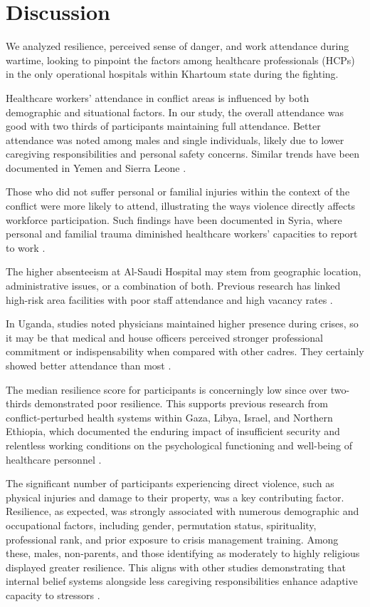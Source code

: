 \documentclass[12pt]{article}
\begin{document}
\section{Discussion}
We analyzed resilience, perceived sense of danger, and work attendance during wartime, looking to pinpoint the factors among healthcare professionals (HCPs) in the only operational hospitals within Khartoum state during the fighting.

Healthcare workers’ attendance in conflict areas is influenced by both demographic and situational factors. In our study, the overall attendance was good with two thirds of participants maintaining full attendance. Better attendance was noted among males and single individuals, likely due to lower caregiving responsibilities and personal safety concerns. Similar trends have been documented in Yemen and Sierra Leone \cite{khader2015factors, wurie2016retention}.

Those who did not suffer personal or familial injuries within the context of the conflict were more likely to attend, illustrating the ways violence directly affects workforce participation. Such findings have been documented in Syria, where personal and familial trauma diminished healthcare workers’ capacities to report to work \cite{fouad2017health, witter2017providing}.

The higher absenteeism at Al-Saudi Hospital may stem from geographic location, administrative issues, or a combination of both. Previous research has linked high-risk area facilities with poor staff attendance and high vacancy rates \cite{pavignani2009analysing}.

In Uganda, studies noted physicians maintained higher presence during crises, so it may be that medical and house officers perceived stronger professional commitment or indispensability when compared with other cadres. They certainly showed better attendance than most \cite{ssengooba2015health}.

The median resilience score for participants is concerningly low since over two-thirds demonstrated poor resilience. This supports previous research from conflict-perturbed health systems within Gaza, Libya, Israel, and Northern Ethiopia, which documented the enduring impact of insufficient security and relentless working conditions on the psychological functioning and well-being of healthcare personnel \cite{sberro2023resilience, alnassar2023mental, abugraga2023health, bashir2022religiosity}.

The significant number of participants experiencing direct violence, such as physical injuries and damage to their property, was a key contributing factor. Resilience, as expected, was strongly associated with numerous demographic and occupational factors, including gender, permutation status, spirituality, professional rank, and prior exposure to crisis management training. Among these, males, non-parents, and those identifying as moderately to highly religious displayed greater resilience. This aligns with other studies demonstrating that internal belief systems alongside less caregiving responsibilities enhance adaptive capacity to stressors \cite{zaman2023parental, saleh2024barriers}.
\end{document}
